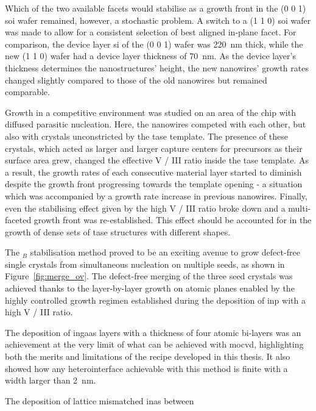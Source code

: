 Which of the two available  facets would stabilise as a growth front in the \hkl(0 0 1) \acf{soi} wafer remained, however, a stochastic problem. A switch to a \hkl(1 1 0) \acs{soi} wafer was made to allow for a consistent selection of best aligned  in-plane facet. For comparison, the device layer \acs{si} of the \hkl(0 0 1) wafer was \qty{220}{\nano\metre} thick, while the new \hkl(1 1 0) wafer had a device layer thickness of \qty{70}{\nano\metre}. As the device layer's thickness determines the nanostructures' height, the new nanowires' growth rates changed slightly compared to those of the old nanowires but remained comparable.

Growth in a competitive environment was studied on an area of the chip with diffused parasitic nucleation. Here, the nanowires competed with each other, but also with crystals unconstricted by the \acs{tase} template. The presence of these crystals, which acted as larger and larger capture centers for precursors as their surface area grew, changed the effective V / III ratio inside the \acs{tase} template. As a result, the growth rates of each consecutive material layer started to diminish despite the growth front progressing towards the template opening - a situation which was accompanied by a growth rate increase in previous nanowires. Finally, even the stabilising effect given by the high V / III ratio broke down and a multi-faceted growth front was re-established. This effect should be accounted for in the growth of dense sets of \acs{tase} structures with different shapes.

The \(_B\) stabilisation method proved to be an exciting avenue to grow defect-free single crystals from simultaneous nucleation on multiple seeds, as shown in Figure~\ref{fig:merge_ov}. The defect-free merging of the three seed crystals was achieved thanks to the layer-by-layer growth on  atomic planes enabled by the highly controlled growth regimen established during the deposition of \acs{inp} with a high V / III ratio.

The deposition of \acs{ingaas} layers with a thickness of four atomic bi-layers was an achievement at the very limit of what can be achieved with \acf{mocvd}, highlighting both the merits and limitations of the recipe developed in this thesis. It also showed how any heterointerface achievable with this method is finite with a width larger than \qty{2}{\nano\metre}.

The deposition of lattice mismatched \acf{inas} between 

